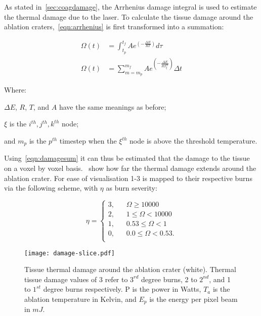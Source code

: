 As stated in~\cref{sec:coagdamage}, the Arrhenius damage integral is used to estimate the thermal damage due to the laser. To calculate the tissue damage around the ablation craters,~\cref{eqn:arrhenius} is first transformed into a summation:

\begin{align}
\Omega(t) &= \int^{t_{f}}_{t_p} Ae^{(-\tfrac{\Delta E}{RT})}d\tau \\
\Omega(t) &= \sum_{m=m_p}^{m_f} Ae^{(-\tfrac{\Delta E}{RT_{\xi}^{m}})}\Delta t\label{eqn:damagesum}
\end{align}
 
\noindent Where: 
	
	\indent $\Delta E$, $R$, $T$, and $A$ have the same meanings as before;
	
	\indent $\xi$ is the $i^{th}, j^{th}, k^{th}$ node;
	
	\indent and $m_p$ is the $p^{th}$ timestep when the $\xi^{th}$ node is above the threshold temperature.

	\medskip
	
	Using~\cref{eqn:damagesum} it can thus be estimated that the damage to the tissue on a voxel by voxel basis.~ show how far the thermal damage extends around the ablation crater. For ease of visualisation 1-3 is mapped to their respective burns via the following scheme, with $\eta$ as burn severity:
	
\begin{equation}
\eta = 
     \begin{cases}
       \text{3,} &\quad \Omega \geq 10000\\
       \text{2,} &\quad 1 \leq \Omega < 10000\\
       \text{1,} &\quad 0.53 \leq \Omega < 1\\
       \text{0,} &\quad 0.0 \leq \Omega< 0.53.\\
     \end{cases}
\label{eqn:thermalbound}
\end{equation}

\begin{figure}[!htbp]
	\centering
	\texttt{[image: damage-slice.pdf]}
	\caption{Tissue thermal damage around the ablation crater (white). Thermal tissue damage values of 3 refer to $3^{rd}$ degree burns, 2 to $2^{nd}$, and 1 to $1^{st}$ degree burns respectively. P is the power in Watts, $T_a$ is the ablation temperature in Kelvin, and $E_p$ is the energy per pixel beam in $mJ$.}
	\label{fig:damfig}
\end{figure}
	

